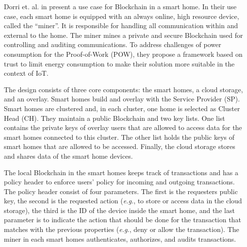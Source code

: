Dorri et. al. in \cite{Dorri2017SmartHome} present a use case for Blockchain in a smart home. In their use case, each smart home is equipped with an always online, high resource device, called the ``miner''. It is responsible for handling all communication within and external to the home.
The miner mines a private and secure Blockchain used for controlling and auditing communications. To address challenges of power consumption for the Proof-of-Work (POW), they propose a framework based on trust to limit energy consumption to make their solution more suitable in the context of IoT.

The design consists of three core components: the smart homes, a cloud storage, and an overlay.
Smart homes build and overlay with the Service Provider (SP). Smart homes are clustered and, in each cluster, one home is selected as Cluster Head (CH).
They maintain a public Blockchain and two key lists. One list contains the private keys of overlay users that are allowed to access data for the smart homes connected to this cluster.
The other list holds the public keys of smart homes that are allowed to be accessed.
Finally, the cloud storage stores and shares data of the smart home devices.

The local Blockchain in the smart homes keeps track of transactions and has a policy header to enforce users' policy for incoming and outgoing transactions.
The policy header consist of four parameters. The first is the requesters public key, the second is the requested action (\textit{e.g.}, to store or access data in the cloud storage), the third is the ID of the device inside the smart home,
and the last parameter is to indicate the action that should be done for the transaction that matches with the previous properties (\textit{e.g.}, deny or allow the transaction).
The miner in each smart homes authenticates, authorizes, and audits transactions.
